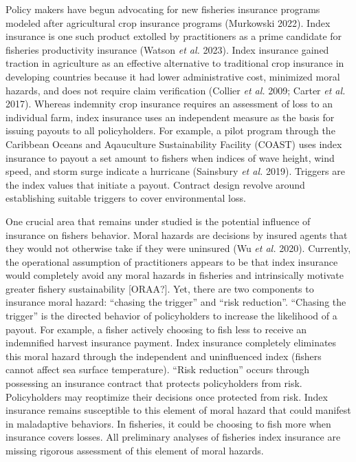 \documentclass[
  letterpaper,
  DIV=11,
  numbers=noendperiod]{scrartcl}
\theoremstyle{plain}
\theoremstyle{plain}
\theoremstyle{remark}
\begin{document}
Policy makers have begun advocating for new fisheries insurance programs
modeled after agricultural crop insurance programs (Murkowski 2022).
Index insurance is one such product extolled by practitioners as a prime
candidate for fisheries productivity insurance (Watson \emph{et al.}
2023). Index insurance gained traction in agriculture as an effective
alternative to traditional crop insurance in developing countries
because it had lower administrative cost, minimized moral hazards, and
does not require claim verification (Collier \emph{et al.} 2009; Carter
\emph{et al.} 2017). Whereas indemnity crop insurance requires an
assessment of loss to an individual farm, index insurance uses an
independent measure as the basis for issuing payouts to all
policyholders. For example, a pilot program through the Caribbean Oceans
and Aqauculture Sustainability Facility (COAST) uses index insurance to
payout a set amount to fishers when indices of wave height, wind speed,
and storm surge indicate a hurricane (Sainsbury \emph{et al.} 2019).
Triggers are the index values that initiate a payout. Contract design
revolve around establishing suitable triggers to cover environmental
loss.

One crucial area that remains under studied is the potential influence
of insurance on fishers behavior. Moral hazards are decisions by insured
agents that they would not otherwise take if they were uninsured (Wu
\emph{et al.} 2020). Currently, the operational assumption of
practitioners appears to be that index insurance would completely avoid
any moral hazards in fisheries and intrinsically motivate greater
fishery sustainability {[}ORAA?{]}. Yet, there are two components to
insurance moral hazard: ``chasing the trigger'' and ``risk reduction''.
``Chasing the trigger'' is the directed behavior of policyholders to
increase the likelihood of a payout. For example, a fisher actively
choosing to fish less to receive an indemnified harvest insurance
payment. Index insurance completely eliminates this moral hazard through
the independent and uninfluenced index (fishers cannot affect sea
surface temperature). ``Risk reduction'' occurs through possessing an
insurance contract that protects policyholders from risk. Policyholders
may reoptimize their decisions once protected from risk. Index insurance
remains susceptible to this element of moral hazard that could manifest
in maladaptive behaviors. In fisheries, it could be choosing to fish
more when insurance covers losses. All preliminary analyses of fisheries
index insurance are missing rigorous assessment of this element of moral
hazards.
\end{document}
